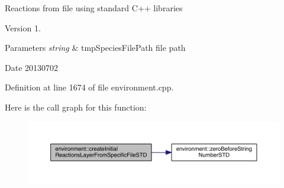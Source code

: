 Reactions from file using standard C++ libraries \begin{DoxyVersion}{Version}
1. 
\end{DoxyVersion}

\begin{DoxyParams}{Parameters}
{\em string} & tmp\-Species\-File\-Path file path \\
\hline
\end{DoxyParams}
\begin{DoxyDate}{Date}
20130702 
\end{DoxyDate}


Definition at line 1674 of file environment.\-cpp.



Here is the call graph for this function\-:
\nopagebreak
\begin{figure}[H]
\begin{center}
\leavevmode
\includegraphics[width=350pt]{a00014_a743956229b11d7860dbc89a18f869586_cgraph}
\end{center}
\end{figure}


